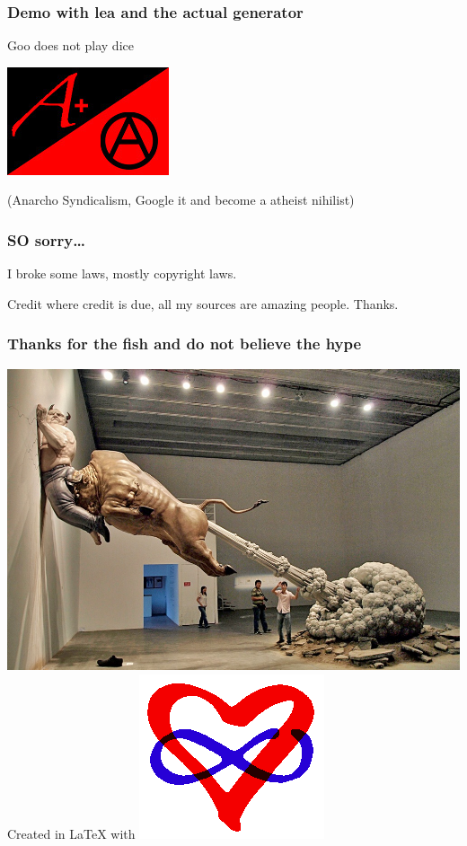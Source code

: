 \documentclass[a4paper]{beamer}
\begin{document}
\begin{frame}

\frametitle{Demo with lea and the actual generator}
Goo does not play dice

\includegraphics[scale=0.60]{img/mjr_anarchist_flag.jpg}

(Anarcho Syndicalism, Google it and become a atheist nihilist)

\end{frame}


\begin{frame}





\frametitle{SO sorry\ldots}
I broke some laws, mostly copyright laws.

Credit where credit is due, all my sources are amazing people. Thanks.
\end{frame}

\begin{frame}
\frametitle{Thanks for the fish and do not believe the hype}
\includegraphics[scale=1.00]{img/bullshit-sculpture.jpg}
\\
Created in \LaTeX{} with \includegraphics[scale=0.05]{img/polyamory.png}

\end{frame}
\end{document}
